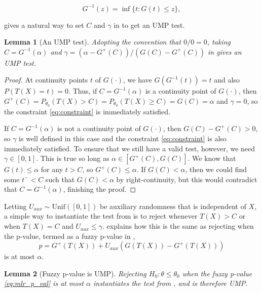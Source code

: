 \documentclass{article}
\newtheorem{lemma}{Lemma}
\begin{document}
\begin{appendix}
\begin{equation*}
    G^{-1}(z) = \inf \{ t : G(t) \leq z\},
\end{equation*}

 gives a natural way to set $C$ and $\gamma$ in  to get an UMP test. 

\begin{lemma}[An UMP test]
    \label{lem:setting_constants} Adopting the convention that $0/0 = 0$, taking $C = G^{-1}(\alpha)$ and $\gamma = (\alpha - G^+(C))/(G(C) - G^+(C))$
    in  gives an UMP test.
\end{lemma}

\begin{proof}
    At continuity points $t$ of $G(\cdot)$, we have $G(G^{-1}(t)) = t$ and also $P(T(X) = t) = 0$. Thus, if $C = G^{-1}(\alpha)$ is a continuity point of $G(\cdot)$, then $G^+(C) = P_{\theta_0}(T(X) > C) = P_{\theta_0}(T(X) \geq C) = G(C) = \alpha$ and $\gamma=0$, so the constraint \eqref{eq:constraint} is immediately satisfied. 

    If $C = G^{-1}(\alpha)$ is not a continuity point of $G(\cdot)$, then $G(C) - G^+(C) > 0$, so $\gamma$ is well defined in this case and the constraint \eqref{eq:constraint} is also immediately satisfied. To ensure that we still have a valid test, however, we need $\gamma \in [0, 1]$. This is true so long as $\alpha \in [G^{+}(C), G(C)]$. We know that $G(t) \leq \alpha$ for any $t > C$, so $G^{+}(C) \leq \alpha$. If $G(C) < \alpha$, then we could find some $t^{-} < C$ such that $G(C) < \alpha$ by right-continuity, but this would contradict that $C = G^{-1}(\alpha)$, finishing the proof. 
\end{proof}

Letting $U_{aux} \sim \text{Unif}([0, 1])$ be auxiliary randomness that is independent of $X$, a simple way to instantiate the test from  is to reject whenever $T(X) > C$ or when $T(X) = C$ and $U_{aux} \leq \gamma$.  explains how this is the same as rejecting when the p-value, termed as a fuzzy p-value in \cite{Geyer}, 
\begin{equation}
    \label{eq:mlr_p_val}
    p = G^+(T(X)) + U_{aux}(G(T(X)) - G^+(T(X))) 
\end{equation}
is at most $\alpha$. 

\begin{lemma}[Fuzzy p-value is UMP]
    \label{lem:fuzzy}
    Rejecting $H_0: \theta \leq \theta_0$ when the fuzzy p-value \eqref{eq:mlr_p_val} is at most $\alpha$ instantiates the test from , and is therefore UMP. 
\end{lemma}


\end{appendix}
\end{document}
